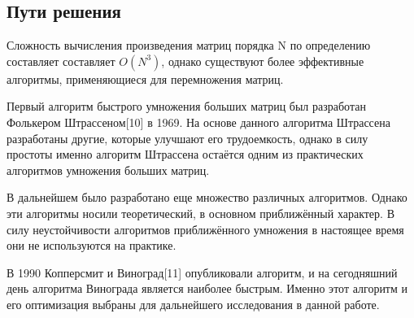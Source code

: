\documentclass[a4paper,14pt]{article} %
\begin{document}
        	
        \subsection{Пути решения}
        \hfill
        
        Сложность вычисления произведения матриц порядка N по определению составляет составляет $O(N^3)$, однако существуют более эффективные алгоритмы, применяющиеся для перемножения матриц. 
        
        Первый алгоритм быстрого умножения больших матриц был разработан Фолькером Штрассеном[10] в 1969. На основе данного алгоритма Штрассена разработаны другие, которые улучшают его трудоемкость, однако в силу простоты  именно алгоритм Штрассена остаётся одним из практических алгоритмов умножения больших матриц. 
        
        В дальнейшем было разработано еще множество различных алгоритмов. Однако эти алгоритмы носили теоретический, в основном приближённый характер. В силу неустойчивости алгоритмов приближённого умножения в настоящее время они не используются на практике.

	В 1990 Копперсмит и Виноград[11] опубликовали алгоритм, и на сегодняшний день алгоритма Винограда является наиболее быстрым. Именно этот алгоритм и его оптимизация выбраны для дальнейшего исследования в данной работе. 
	
	\hfill
	
\end{document}
